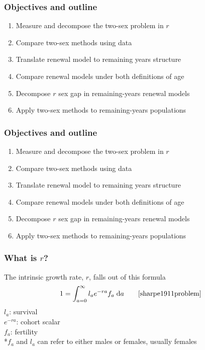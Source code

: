 \documentclass{beamer}
\newcommand{\dd}{\; \mathrm{d}}
\begin{document}
\begin{frame}
   \frametitle{Objectives and outline}
   \begin{enumerate}[<+->]
   \item Measure and decompose the two-sex problem in $r$
   \item Compare two-sex methods using data 
   \item Translate renewal model to remaining years structure
   \item Compare renewal models under both definitions of age 
   \item Decompose $r$ sex gap in remaining-years renewal models
   \item Apply two-sex methods to remaining-years populations 
   \end{enumerate}
\end{frame}

\begin{frame}

   \frametitle{Objectives and outline}
   \begin{enumerate}
   \item Measure and decompose the two-sex problem in $r$
   \item \textcolor[gray]{.7}{Compare two-sex methods using data}
   \item Translate renewal model to remaining years structure
   \item Compare renewal models under both definitions of age 
   \item Decompose $r$ sex gap in remaining-years renewal models
   \item \textcolor[gray]{.7}{Apply two-sex methods to
   remaining-years populations}
   \end{enumerate}
\end{frame}

\begin{frame}
  \frametitle{What is $r$?}
  The intrinsic growth rate, $r$, falls out of this formula
  \begin{equation}
  1 = \int _{a=0}^\infty l_ae^{-ra}f_a \dd a \notag \quad \quad
  \mathrm{\cite{sharpe1911problem}}
  \end{equation}
  $l_a$:  survival \\
  $e^{-ra}$: cohort scalar \\
  $f_a$: fertility \\
  \vspace{1em}
   *$f_a$ and $l_a$ can refer to either males or females, usually
  females
\end{frame}
\end{document}
